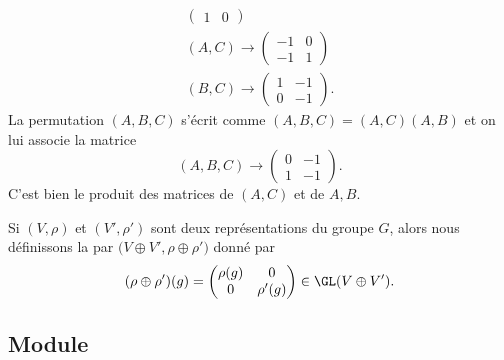 \begin{example}
\begin{subequations}
\begin{align}
\begin{pmatrix}
                1    &   0    
            \end{pmatrix}\\
            (A,C)\to \begin{pmatrix}
                -1    &   0    \\ 
                -1    &   1    
            \end{pmatrix}\\
            (B,C)\to\begin{pmatrix}
                1    &   -1    \\ 
                0    &   -1    
            \end{pmatrix}.
        \end{align}
    \end{subequations}
    La permutation \( (A,B,C)\) s'écrit comme \( (A,B,C)=(A,C)(A,B)\) et on lui associe la matrice
    \begin{equation}
        (A,B,C)\to\begin{pmatrix}
            0    &   -1    \\ 
            1    &   -1    
        \end{pmatrix}.
    \end{equation}
    C'est bien le produit des matrices de \( (A,C)\) et de \( A,B\).
\end{example}

Si \( (V,\rho)\) et \( (V',\rho')\) sont deux représentations du groupe \( G\), alors nous définissons la  par \( \big( V\oplus V',\rho\oplus\rho' \big)\) donné par
\begin{equation}
    (\rho\oplus\rho')(g)=\begin{pmatrix}
        \rho(g)    &   0    \\ 
        0    &   \rho'(g)    
    \end{pmatrix}\in \GL(V\oplus V').
\end{equation}

\subsection{Module}

